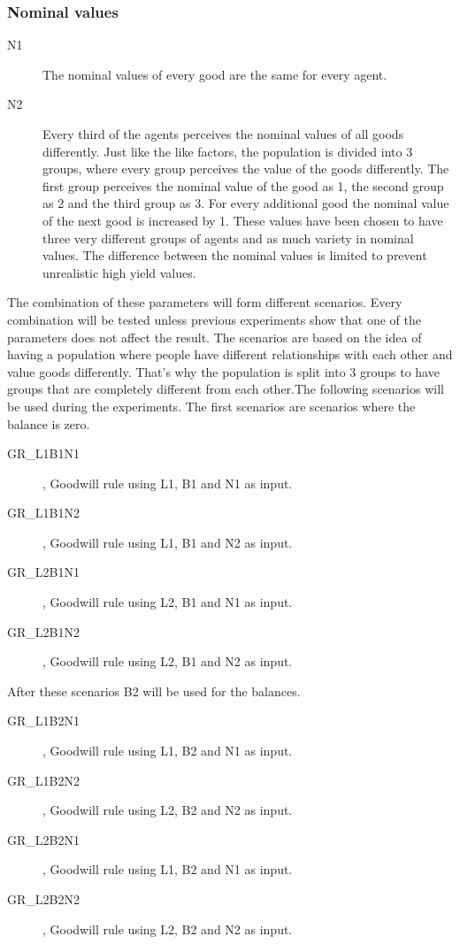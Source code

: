 \documentclass[twoside,openright]{uva-bachelor-thesis}
\begin{document}
\subsubsection{Nominal values}
\begin{description}
\item[N1]	The nominal values of every good are the same for every agent.
\item[N2]	Every third of the agents perceives the nominal values of all goods differently. Just like the like factors, the population is divided into 3 groups, where every group perceives the value of the goods differently. The first group perceives the nominal value of the good as 1, the second group as 2 and the third group as 3. For every additional good the nominal value of the next good is increased by 1. These values have been chosen to have three very different groups of agents and as much variety in nominal values. The difference between the nominal values is limited to prevent unrealistic high yield values.
\end{description} 
The combination of these parameters will form different scenarios. Every combination will be tested unless previous experiments show that one of the parameters does not affect the result. The scenarios are based on the idea of having a population where people have different relationships with each other and value goods differently. That’s why the population is split into 3 groups to have groups that are completely different from each other.The following scenarios will be used during the experiments.
The first scenarios are scenarios where the balance is zero.
\begin{description}
\item[GR\_L1B1N1], Goodwill rule using L1, B1 and N1 as input.
\item[GR\_L1B1N2], Goodwill rule using L1, B1 and N2 as input.
\item[GR\_L2B1N1], Goodwill rule using L2, B1 and N1 as input.
\item[GR\_L2B1N2], Goodwill rule using L2, B1 and N2 as input.
\end{description}
After these scenarios B2 will be used for the balances.
\begin{description}
\item[GR\_L1B2N1], Goodwill rule using L1, B2 and N1 as input.
\item[GR\_L1B2N2], Goodwill rule using L2, B2 and N2 as input.
\item[GR\_L2B2N1], Goodwill rule using L1, B2 and N1 as input.
\item[GR\_L2B2N2], Goodwill rule using L2, B2 and N2 as input.
\end{description}
\end{document}
